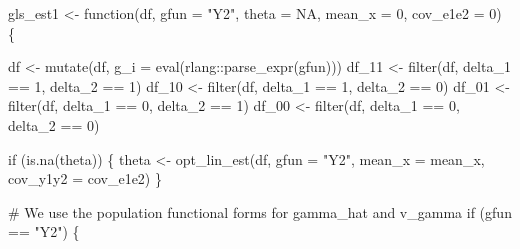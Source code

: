 \documentclass[
  letterpaper,
  DIV=11,
  numbers=noendperiod]{scrartcl}
\newenvironment{Shaded}{\begin{snugshade}}{\end{snugshade}}
\newcommand{\AttributeTok}[1]{\textcolor[rgb]{0.40,0.45,0.13}{#1}}
\newcommand{\CommentTok}[1]{\textcolor[rgb]{0.37,0.37,0.37}{#1}}
\newcommand{\ConstantTok}[1]{\textcolor[rgb]{0.56,0.35,0.01}{#1}}
\newcommand{\ControlFlowTok}[1]{\textcolor[rgb]{0.00,0.23,0.31}{#1}}
\newcommand{\DecValTok}[1]{\textcolor[rgb]{0.68,0.00,0.00}{#1}}
\newcommand{\FunctionTok}[1]{\textcolor[rgb]{0.28,0.35,0.67}{#1}}
\newcommand{\NormalTok}[1]{\textcolor[rgb]{0.00,0.23,0.31}{#1}}
\newcommand{\OtherTok}[1]{\textcolor[rgb]{0.00,0.23,0.31}{#1}}
\newcommand{\SpecialCharTok}[1]{\textcolor[rgb]{0.37,0.37,0.37}{#1}}
\newcommand{\StringTok}[1]{\textcolor[rgb]{0.13,0.47,0.30}{#1}}
\begin{document}
\begin{Shaded}
\begin{Highlighting}[]
\NormalTok{gls\_est1 }\OtherTok{\textless{}{-}} \ControlFlowTok{function}\NormalTok{(df, }\AttributeTok{gfun =} \StringTok{"Y2"}\NormalTok{, }\AttributeTok{theta =} \ConstantTok{NA}\NormalTok{, }\AttributeTok{mean\_x =} \DecValTok{0}\NormalTok{, }\AttributeTok{cov\_e1e2 =} \DecValTok{0}\NormalTok{) \{}

\NormalTok{  df }\OtherTok{\textless{}{-}} \FunctionTok{mutate}\NormalTok{(df, }\AttributeTok{g\_i =} \FunctionTok{eval}\NormalTok{(rlang}\SpecialCharTok{::}\FunctionTok{parse\_expr}\NormalTok{(gfun)))}
\NormalTok{  df\_11 }\OtherTok{\textless{}{-}} \FunctionTok{filter}\NormalTok{(df, delta\_1 }\SpecialCharTok{==} \DecValTok{1}\NormalTok{, delta\_2 }\SpecialCharTok{==} \DecValTok{1}\NormalTok{)}
\NormalTok{  df\_10 }\OtherTok{\textless{}{-}} \FunctionTok{filter}\NormalTok{(df, delta\_1 }\SpecialCharTok{==} \DecValTok{1}\NormalTok{, delta\_2 }\SpecialCharTok{==} \DecValTok{0}\NormalTok{)}
\NormalTok{  df\_01 }\OtherTok{\textless{}{-}} \FunctionTok{filter}\NormalTok{(df, delta\_1 }\SpecialCharTok{==} \DecValTok{0}\NormalTok{, delta\_2 }\SpecialCharTok{==} \DecValTok{1}\NormalTok{)}
\NormalTok{  df\_00 }\OtherTok{\textless{}{-}} \FunctionTok{filter}\NormalTok{(df, delta\_1 }\SpecialCharTok{==} \DecValTok{0}\NormalTok{, delta\_2 }\SpecialCharTok{==} \DecValTok{0}\NormalTok{)}

  \ControlFlowTok{if}\NormalTok{ (}\FunctionTok{is.na}\NormalTok{(theta)) \{}
\NormalTok{    theta }\OtherTok{\textless{}{-}} \FunctionTok{opt\_lin\_est}\NormalTok{(df, }\AttributeTok{gfun =} \StringTok{"Y2"}\NormalTok{, }\AttributeTok{mean\_x =}\NormalTok{ mean\_x, }\AttributeTok{cov\_y1y2 =}\NormalTok{ cov\_e1e2)}
\NormalTok{  \}}

  \CommentTok{\# We use the population functional forms for gamma\_hat and v\_gamma}
  \ControlFlowTok{if}\NormalTok{ (gfun }\SpecialCharTok{==} \StringTok{"Y2"}\NormalTok{) \{}


\end{Highlighting}
\end{Shaded}
\end{document}
